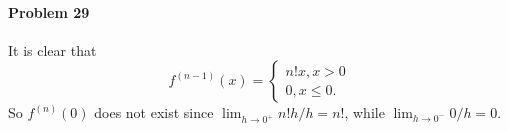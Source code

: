 \documentclass{article}
\begin{document}
\paragraph{Problem 29} It is clear that \[
  f^{(n-1)}(x) =
  \begin{cases}
    n!x, x > 0 \\
    0, x \leq 0.
  \end{cases}
\] So $f^{(n)}(0)$ does not exist since $\lim_{h \to 0^+} n!h/h = n!$, while
$\lim_{h \to 0^-} 0/h = 0$.
\end{document}
